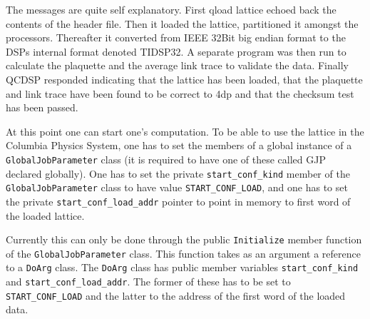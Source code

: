 The messages are quite self explanatory. First qload lattice echoed back
the contents of the header file. Then it loaded the lattice, partitioned
it amongst the processors. Thereafter it converted from IEEE 32Bit big
endian format to the DSPs internal format denoted TIDSP32. A separate
program was then run to calculate the plaquette and the average link trace
to validate the data. Finally QCDSP responded indicating that the
lattice has been loaded, that the plaquette and link trace have been
found to be correct to 4dp and that the checksum test has been passed.

At this point one can start one's computation. To be able to use the
lattice in the Columbia Physics System, one has to set the members of a global
instance of a {\tt GlobalJobParameter} class (it is required to have
one of these called GJP declared globally).  One has to set the
private {\tt start\_conf\_kind} member of the {\tt
GlobalJobParameter} class to have value {\tt START\_CONF\_LOAD}, and
one has to set the private {\tt start\_conf\_load\_addr} pointer to
point in memory to first word of the loaded lattice.

Currently this can only be done through the public {\tt Initialize} member 
function of the {\tt GlobalJobParameter} class. This function takes as 
an argument a reference to a {\tt DoArg} class. The {\tt DoArg} class
has public member variables {\tt start\_conf\_kind} and {\tt start\_conf\_load\_addr}. The former of these has to be set to {\tt START\_CONF\_LOAD} 
and the latter to the address of the first word of the loaded data.

